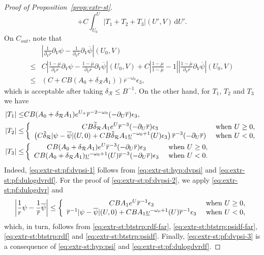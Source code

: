 \documentclass[10pt, reqno]{amsart}
\theoremstyle{definition}
\theoremstyle{remark}
\theoremstyle{conjecture}
\numberwithin{equation}{section}
\newcommand{\abs}[1]{\vert#1\vert}
\newcommand{\ud}{\mathrm{d}}
\newcommand{\rd}{\partial}
\newcommand{\0}{\emptyset}
\newcommand{\dlt}{\delta}
\newcommand{\eps}{\epsilon}
\newcommand{\omg}{\omega}
\newcommand{\ups}{\upsilon}
\newcommand{\calR}{\mathcal R}
\newcommand{\psibg}{\overline{\psi}}				%
\newcommand{\rbg}{\overline{r}}					%
\newcommand{\mubg}{\overline{\mu}}				%
\newcommand{\Abs}[1]{\left\vert #1 \right\vert}
\begin{document}
\begin{proof}[Proof of Proposition~\ref{prop:extr-st}]
\begin{equation*}
		+ C \int_{U_{0}}^{U} \abs{T_{1} + T_{2} + T_{3}}(U', V) \, \ud U'.
\end{equation*}
On $C_{out}$, note that
\begin{align*}
& \Abs{\frac{1}{\rd_{V} r} \rd_{V} \psi - \frac{1}{\rd_{V} \rbg} \rd_{V} \psibg}(U_{0}, V)\\
\leq & C \Abs{\frac{1-\mu}{\rd_{V} r} \rd_{V} \psi - \frac{1-\mubg}{\rd_{V} \rbg} \rd_{V} \psibg}(U_{0}, V) + C \Abs{\frac{1-\mu}{1-\mubg} - 1} \Abs{\frac{1-\mubg}{\rd_{V} \rbg} \rd_{V} \psibg} (U_0,V) \\
\leq & (C + C B (A_{0} + \dlt_{\calR} A_{1})) \rbg^{-\omg_0} \eps_{3},
\end{align*}
which is acceptable after taking $\dlt_{\calR} \leq B^{-1}$.
On the other hand, for $T_{1}$, $T_{2}$ and $T_{3}$ we have
\begin{align}
	\abs{T_{1}} \leq & C B (A_{0} + \dlt_{\calR} A_{1}) e^{U_{+}} \rbg^{-2 -\omg_0} (-\rd_{U} \rbg) \eps_{3}, \label{eq:extr-st:pf:dvpsi-1} \\
	\abs{T_{2}} \leq &\left\{ \begin{array}{cl}
	\displaystyle{C B \widetilde{\dlt}_{\calR} A_{1} e^{U} \rbg^{-3} (-\rd_{U} \rbg) \eps_{3}}  & \hbox{ when } U \geq 0, \\
	\displaystyle{\left(C \tilde{\dlt}_{\calR} \abs{\psi - \psibg}(U, 0) + C B \tilde{\dlt}_{\calR} A_{1} \underline{\ups}^{-\omg_0+1}(U) \eps_{3} \right) \rbg^{-3} (-\rd_{U} \rbg)  }  & \hbox{ when } U < 0,
	\end{array} \right.  \label{eq:extr-st:pf:dvpsi-2} \\
	\abs{T_{3}} \leq &\left\{ \begin{array}{cl}
	C B (A_{0} + \dlt_{\calR} A_{1}) e^{U} \rbg^{-3} (-\rd_{U} \rbg) \eps_{3}   & \hbox{ when } U \geq 0, \\
	C B (A_{0} + \dlt_{\calR} A_{1})  \underline{\ups}^{-\omg_0+1}(U)  \rbg^{-3} (-\rd_{U} \rbg) \eps_{3}   & \hbox{ when } U < 0.
	\end{array} \right.  \label{eq:extr-st:pf:dvpsi-3}
\end{align}
Indeed, \eqref{eq:extr-st:pf:dvpsi-1} follows from \eqref{eq:extr-st:hyp:dvpsi} and \eqref{eq:extr-st:pf:dulogdvrdf}. For the proof of \eqref{eq:extr-st:pf:dvpsi-2}, we apply \eqref{eq:extr-st:pf:dulogdvr} and
\begin{equation*} 
	\Abs{\frac{1}{r} \psi - \frac{1}{\rbg} \psibg}
	\leq \left\{ \begin{array}{cl}
	C B A_{1} e^{U} \rbg^{-1} \eps_{3}  & \hbox{ when } U \geq 0, \\
	\rbg^{-1} \abs{\psi - \psibg}(U, 0) + C B A_{1} \underline{\ups}^{-\omg_0+1}(U) \rbg^{-1}  \eps_{3}  & \hbox{ when } U < 0,
	\end{array} \right.
\end{equation*}
which, in turn, follows from \eqref{eq:extr-st:btstrp:rdf-far}, \eqref{eq:extr-st:btstrp:psidf-far}, \eqref{eq:extr-st:btstrp:rdf} and \eqref{eq:extr-st:btstrp:psidf}. Finally, \eqref{eq:extr-st:pf:dvpsi-3} is a consequence of \eqref{eq:extr-st:hyp:psi} and \eqref{eq:extr-st:pf:dulogdvrdf}.


\end{proof}
\end{document}
